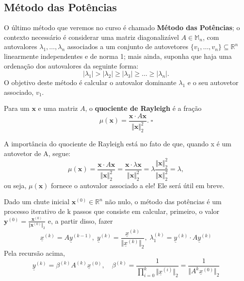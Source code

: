 \documentclass[../numerical_methods.tex]{subfiles}
\begin{document}
\subsection{Método das Potências}
O último método que veremos no curso é chamado \textbf{Método das Potências}; o contexto necessário é considerar uma matriz diagonalizável \(A\in \mathbb{M}_{n}\), com autovalores \(\lambda_1, \dotsc , \lambda_{n}\) associados a um conjunto de autovetores \(\{v_1, \dotsc , v_{n}\}\subseteq \mathbb{R}^{n}\) linearmente independentes e de norma 1; mais ainda, suponha que haja uma ordenação dos autovalores da seguinte forma:
\[
	| \lambda_1 | > | \lambda_2 | \geq | \lambda_3 | \geq \dotsc \geq | \lambda_{n} |.
\]
O objetivo deste método é calcular o autovalor dominante \(\lambda_1\) e o seu autovetor associado, \(v_1\).
\begin{def*}
	Para um  \(\mathbf{x}\) e uma matriz \(A\), o \textbf{quociente de Rayleigh} é a fração
	\[
		\mu (\mathbf{x}) = \frac{\mathbf{x}\cdot A \mathbf{x}}{\Vert \mathbf{x} \Vert_{2}^{2}}. \; \square
	\]
\end{def*}
A importância do quociente de Rayleigh está no fato de que, quando x é um autovetor de A, segue:
\[
	\mu (\mathbf{x}) = \frac{\mathbf{x} \cdot A \mathbf{x}}{\Vert \mathbf{x} \Vert_{2}^{2}}=\frac{\mathbf{x}\cdot \lambda \mathbf{x}}{\Vert \mathbf{x} \Vert_{2}^{2}}= \lambda \frac{\Vert \mathbf{x} \Vert_{2}^{2}}{\Vert \mathbf{x} \Vert_{2}^{2}} = \lambda ,
\]
ou seja, \(\mu (\mathbf{x})\) fornece o autovalor associado a ele! Ele será útil em breve.

Dado um chute inicial \(\mathbf{x}^{(0)}\in \mathbb{R}^{n}\) não nulo, o método das potências é um processo iterativo de k passos que consiste em calcular, primeiro, o valor \(\mathbf{y}^{(0)} = \frac{\mathbf{x}^{(0)}}{\Vert \mathbf{x}^{(0)} \Vert_{2}}\) e, a partir disso, fazer
\[
	\boxed{\underline{x}^{(k)} = A \underline{y}^{(k-1)},\; \underline{y}^{(k)} = \frac{\underline{x}^{(k)}}{\Vert \underline{x}^{(k)} \Vert_{2}},\; \lambda_{1}^{(k)} = \underline{y}^{(k)}\cdot A\underline{y}^{(k)}}
\]
Pela recursão acima,
\[
	\underline{y}^{(k)}=\beta^{(k)}A^{(k)}\underline{x}^{(0)}, \quad \beta^{(k)} = \frac{1}{\prod\limits_{i=0}^{k}\Vert \underline{x}^{(i)} \Vert_{2}} = \frac{1}{\Vert A^{k}\underline{x}^{(0)} \Vert_{2}}
\]
\end{document}
